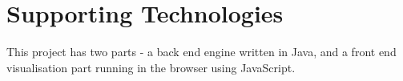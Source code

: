 \documentclass[ %
                    author={Alexander Hill},
                supervisor={Dr. Benjamin Sach},
                    degree={MEng},
                     title={MARMOSET: Multi Agent Real-time Multi-core Online
                     Simulation for Efficient Transportation},
                  subtitle={},
                      type={research},
                      year={2016} ]{dissertation}
\begin{document}





\chapter*{Supporting Technologies}

\noindent
This project has two parts - a back end engine written in Java, and a front end
visualisation part running in the browser using JavaScript.
\end{document}
